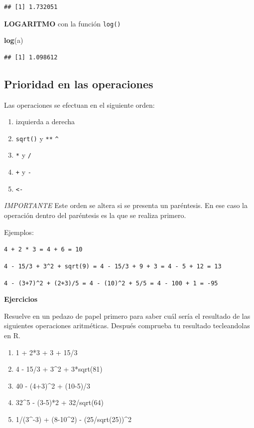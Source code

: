 \documentclass[
]{book}
\newenvironment{Shaded}{\begin{snugshade}}{\end{snugshade}}
\newcommand{\FunctionTok}[1]{\textcolor[rgb]{0.13,0.29,0.53}{\textbf{#1}}}
\newcommand{\NormalTok}[1]{#1}
\providecommand{\tightlist}{%
  \setlength{\itemsep}{0pt}\setlength{\parskip}{0pt}}
\begin{document}
\begin{verbatim}
## [1] 1.732051
\end{verbatim}

\textbf{LOGARITMO} con la función \texttt{log()}

\begin{Shaded}
\begin{Highlighting}[]
\FunctionTok{log}\NormalTok{(a)}
\end{Highlighting}
\end{Shaded}

\begin{verbatim}
## [1] 1.098612
\end{verbatim}

\subsection{Prioridad en las operaciones}\label{prioridad-en-las-operaciones}

Las operaciones se efectuan en el siguiente orden:

\begin{enumerate}
\def\labelenumi{\arabic{enumi}.}
\tightlist
\item
  izquierda a derecha
\item
  \texttt{sqrt()} y \texttt{**} \texttt{\^{}}
\item
  \texttt{*} y \texttt{/}
\item
  \texttt{+} y \texttt{-}
\item
  \texttt{\textless{}-}
\end{enumerate}

\emph{IMPORTANTE} Este orden se altera si se presenta un paréntesis. En ese caso la operación dentro del paréntesis es la que se realiza primero.

Ejemplos:

\texttt{4\ +\ 2\ *\ 3\ =\ 4\ +\ 6\ =\ 10}

\texttt{4\ -\ 15/3\ +\ 3\^{}2\ +\ sqrt(9)\ =\ 4\ -\ 15/3\ +\ 9\ +\ 3\ =\ 4\ -\ 5\ +\ 12\ =\ 13}

\texttt{4\ -\ (3+7)\^{}2\ +\ (2+3)/5\ =\ 4\ -\ (10)\^{}2\ +\ 5/5\ =\ 4\ -\ 100\ +\ 1\ =\ -95}

\textbf{Ejercicios}

Resuelve en un pedazo de papel primero para saber cuál sería el resultado de las siguientes operaciones aritméticas. Después comprueba tu resultado tecleandolas en R.

\begin{enumerate}
\def\labelenumi{\arabic{enumi}.}
\tightlist
\item
  1 + 2*3 + 3 + 15/3
\item
  4 - 15/3 + 3\^{}2 + 3*sqrt(81)
\item
  40 - (4+3)\^{}2 + (10-5)/3
\item
  32\^{}5 - (3-5)*2 + 32/sqrt(64)
\item
  1/(3\^{}-3) + (8-10\^{}2) - (25/sqrt(25))\^{}2
\end{enumerate}
\end{document}
